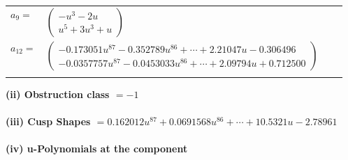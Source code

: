 \documentclass[1p]{elsarticle_modified}
\theoremstyle{definition}
\begin{document}
\begin{tabular}{m{7pt} m{180pt} m{7pt} m{180pt} }
\flushright $a_{9}=$&$\begin{pmatrix}- u^3-2 u\\u^5+3 u^3+u\end{pmatrix}$ \\
\flushright $a_{12}=$&$\begin{pmatrix}-0.173051 u^{87}-0.352789 u^{86}+\cdots+2.21047 u-0.306496\\-0.0357757 u^{87}-0.0453033 u^{86}+\cdots+2.09794 u+0.712500\end{pmatrix}$\\&\end{tabular}
\flushleft \textbf{(ii) Obstruction class $= -1$}\\~\\
\flushleft \textbf{(iii) Cusp Shapes $= 0.162012 u^{87}+0.0691568 u^{86}+\cdots+10.5321 u-2.78961$}\\~\\
\newpage\renewcommand{\arraystretch}{1}
\flushleft \textbf{(iv) u-Polynomials at the component}\newline \\
\end{document}
